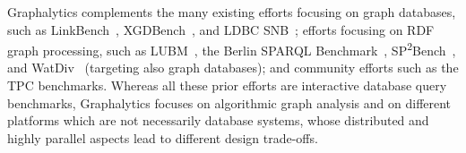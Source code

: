 Graphalytics complements the many existing efforts focusing on graph databases, such as 
LinkBench~\cite{DBLP:conf/sigmod/ArmstrongPBC13}, 
XGDBench~\cite{DBLP:journals/ase/DayarathnaS14}, and 
LDBC SNB~\cite{DBLP:conf/sigmod/ErlingALCGPPB15,DBLP:conf/grades/SzarnyasPAMPKEB18};  
efforts focusing on RDF graph processing, such as 
LUBM~\cite{DBLP:journals/ws/GuoPH05},
the Berlin {SPARQL} Benchmark~\cite{DBLP:journals/ijswis/BizerS09},
SP\textsuperscript{2}Bench~\cite{DBLP:conf/icde/SchmidtHLP09},
and WatDiv~\cite{DBLP:conf/semweb/AlucHOD14} (targeting also graph databases);
and community efforts such as the TPC benchmarks.
Whereas all these prior efforts are interactive database query benchmarks, Graphalytics focuses on algorithmic graph analysis and on different platforms which are not necessarily database systems, whose distributed and highly parallel aspects lead to different design trade-offs.


